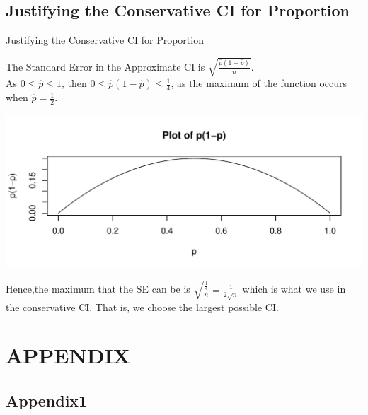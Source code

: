 \documentclass[t,xcolor=pdftex,dvipsnames,table]{beamer}\usepackage[]{graphicx}\usepackage[]{color}
\makeatletter
\def\maxwidth{ %
  \ifdim\Gin@nat@width>\linewidth
    \linewidth
  \else
    \Gin@nat@width
  \fi
}
\newenvironment{knitrout}{}{} %
\makeatother
\begin{document}
\subsection[Justifying the Conservative CI for Proportion]{Justifying the Conservative CI for Proportion}
\begin{frame}[fragile]{Justifying the Conservative CI for Proportion}

The Standard Error in the Approximate CI is $\sqrt{ \frac{\hat{p}(1- \hat{p})}{n} }$. \\

As $0 \leq \hat{p} \leq 1$, then
 $0 \leq \hat{p}(1- \hat{p}) \leq \frac{1}{4}$, as the maximum of the function occurs when $\hat{p} = \frac{1}{2}$.
 
\begin{knitrout}
\color{fgcolor}
\includegraphics[width=\maxwidth]{figure/unnamed-chunk-189-1} 

\end{knitrout}
 
Hence,the maximum that the SE can be is 
$\sqrt{ \frac{\frac{1}{4}}{n} } = \frac{1}{2 \sqrt{n}}$
which is what we use in the conservative CI. That is, we choose the largest possible CI.
\end{frame}



\section[APPENDIX]{APPENDIX}
\subsection[Appendix1]{Appendix1}
\end{document}
